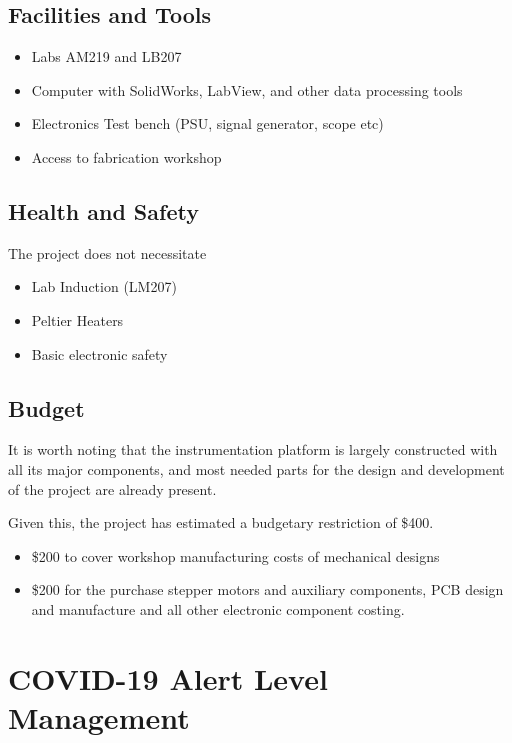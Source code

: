 \documentclass[11pt, a4paper, twoside, openright]{report}
\begin{document}
\subsection{Facilities and Tools}
\begin{itemize}
  \item Labs AM219 and LB207
  \item Computer with SolidWorks, LabView, and other data processing tools
  \item Electronics Test bench (PSU, signal generator, scope etc)
  \item Access to fabrication workshop
\end{itemize}

\subsection{Health and Safety}
The project does not necessitate
\begin{itemize}
  \item Lab Induction (LM207)
  \item Peltier Heaters
  \item Basic electronic safety
\end{itemize}


\subsection{Budget}
It is worth noting that the instrumentation platform is largely constructed with all its major components, and most needed parts for the design and development of the project are already present.

Given this, the project has estimated a budgetary restriction of \$400.
\begin{itemize}
  \item \$200 to cover workshop manufacturing costs of mechanical designs
  \item \$200 for the purchase stepper motors and auxiliary components, PCB design and manufacture and all other electronic component costing.
\end{itemize}

\section{COVID-19 Alert Level Management}


\backmatter

\nocite{*}


\end{document}
